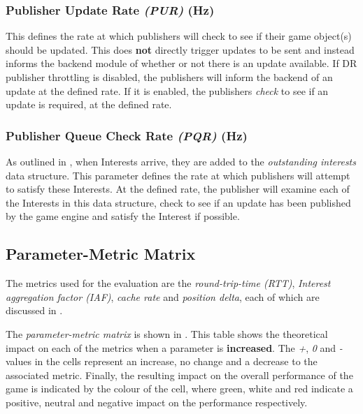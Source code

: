 \subsubsection*{Publisher Update Rate \textit{(PUR)} (Hz)}
This defines the rate at which publishers will check to see if their game object(s) should be updated. This does \textbf{not} directly trigger updates to be sent and instead informs the backend module of whether or not there is an update available. If DR publisher throttling is disabled, the publishers will inform the backend of an update at the defined rate. If it is enabled, the publishers \textit{check} to see if an update is required, at the defined rate. 

\subsubsection*{Publisher Queue Check Rate \textit{(PQR)} (Hz)}
As outlined in , when Interests arrive, they are added to the \textit{outstanding interests} data structure. This parameter defines the rate at which publishers will attempt to satisfy these Interests. At the defined rate, the publisher will examine each of the Interests in this data structure, check to see if an update has been published by the game engine and satisfy the Interest if possible. 

\subsection{Parameter-Metric Matrix}
The metrics used for the evaluation are the \textit{round-trip-time (RTT)}, \textit{Interest aggregation factor (IAF)}, \textit{cache rate} and \textit{position delta}, each of which are discussed in .

The \textit{parameter-metric matrix} is shown in . This table shows the theoretical impact on each of the metrics when a parameter is \textbf{increased}. The \textit{+}, \textit{0} and \textit{-} values in the cells represent an increase, no change and a decrease to the associated metric. Finally, the resulting impact on the overall performance of the game is indicated by the colour of the cell, where green, white and red indicate a positive, neutral and negative impact on the performance respectively. 

